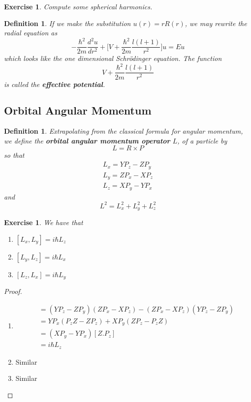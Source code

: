 \documentclass[12pt]{amsart}
\newtheorem{defn}[thm]{Definition}
\newtheorem{ex}[thm]{Exercise}
\newcommand{\sch}{Schr\"{o}dinger }
\begin{document}
\begin{ex}
Compute some spherical harmonics.
\end{ex}

\begin{defn}
If we make the substitution $u(r) = rR(r)$, we may rewrite the radial equation as $$-\frac{\hbar^2}{2m}\frac{d^2u}{dr^2} + \bigg[V+ \frac{\hbar^2}{2m}\frac{l(l+1)}{r^2} \bigg]u = Eu$$ which looks like the one dimensional \sch equation. The function $$V+ \frac{\hbar^2}{2m}\frac{l(l+1)}{r^2}$$ is called the \textbf{effective potential}.
\end{defn}
\newpage

\subsection{Orbital Angular Momentum}
\begin{defn}
Extrapolating from the classical formula for angular momentum, we define the \textbf{orbital angular momentum operator} $L$, of a particle by $$L = R \times P$$ so that 
\begin{align*}
L_x = YP_z - ZP_y\\
L_y = ZP_x - XP_z\\
L_z = XP_y - YP_x
\end{align*}
and $$L^2 = L_x^2 + L_y^2 + L_z^2$$
\end{defn}

\begin{ex}
We have that 
\begin{enumerate}
\item $[L_x,L_y] = i \hbar L_z$
\item $[L_y,L_z] = i \hbar L_x$
\item $[L_z,L_x] = i \hbar L_y$
\end{enumerate}
\end{ex}

\begin{proof}\
\begin{enumerate}
\item 
\begin{align*}
[L_x,L_y] 
&= (YP_z -ZP_y)(ZP_x - XP_z) - (ZP_x - XP_z)(YP_z -ZP_y)\\
&= YP_x(P_zZ-ZP_z) + XP_y(ZP_z - P_zZ)\\
&= (XP_y-YP_x)[Z.P_z]\\
&= i \hbar L_z 
\end{align*}
\item Similar
\item Similar
\end{enumerate}
\end{proof}
\end{document}
